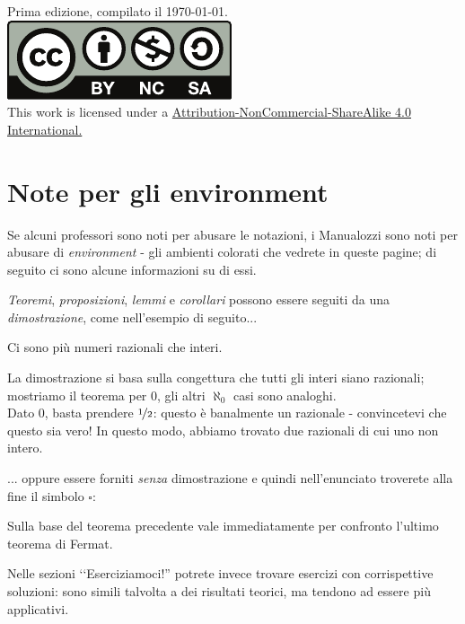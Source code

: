 \vfill
\begin{center}
	Prima edizione, compilato il \today.\\
			\includegraphics[trim=0cm 0cm 0cm 0cm,clip,scale=0.5]{images/Cc-by-nc-sa_icon.pdf}\\
	{\footnotesize This work is licensed under a \href{https://creativecommons.org/licenses/by-sa/4.0/}{Attribution-NonCommercial-ShareAlike 4.0 International.}}
\end{center}
\newpage
\section*{Note per gli environment}
Se alcuni professori sono noti per abusare le notazioni, i Manualozzi sono noti per abusare di \textit{environment} - gli ambienti colorati che vedrete in queste pagine; di seguito ci sono alcune informazioni su di essi.

\noindent\textit{Teoremi}, \textit{proposizioni}, \textit{lemmi} e \textit{corollari} possono essere seguiti da una \textit{dimostrazione}, come nell'esempio di seguito...
\begin{theoremanote}
	Ci sono più numeri razionali che interi.
\end{theoremanote}
\begin{demonstration}
	La dimostrazione si basa sulla congettura che tutti gli interi siano razionali; mostriamo il teorema per $0$, gli altri $\aleph_0$ casi sono analoghi.\\
	Dato $0$, basta prendere $\nicefrac{1}{2}$: questo è banalmente un razionale - convincetevi che questo sia vero! In questo modo, abbiamo trovato due razionali di cui uno non intero.
\end{demonstration}
... oppure essere forniti \textit{senza} dimostrazione e quindi nell'enunciato troverete alla fine il simbolo $\square$:
\begin{corollarynote}
	Sulla base del teorema precedente vale immediatamente per confronto l'ultimo teorema di Fermat.
\end{corollarynote}
Nelle sezioni ‘‘Eserciziamoci!'' potrete invece trovare esercizi con corrispettive soluzioni: sono simili talvolta a dei risultati teorici, ma tendono ad essere più applicativi.

